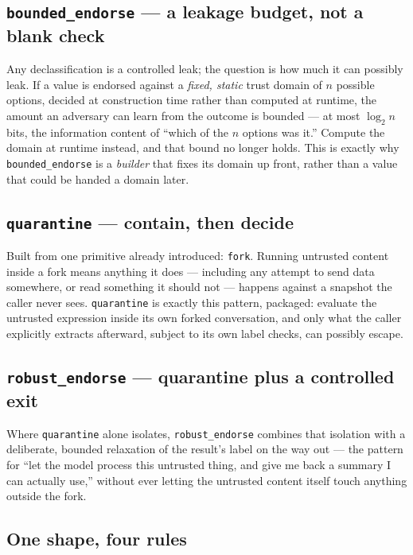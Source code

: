 \documentclass[11pt, a4paper]{article}
\begin{document}
\subsection{\texttt{bounded\_endorse} --- a leakage budget, not a blank check}

Any declassification is a controlled leak; the question is how much it
can possibly leak. If a value is endorsed against a \emph{fixed, static}
trust domain of $n$ possible options, decided at construction time rather
than computed at runtime, the amount an adversary can learn from the
outcome is bounded --- at most $\log_2 n$ bits, the information content of
``which of the $n$ options was it.'' Compute the domain at runtime
instead, and that bound no longer holds. This is exactly why
\lstinline{bounded_endorse} is a \emph{builder} that fixes its domain up
front, rather than a value that could be handed a domain later.

\subsection{\texttt{quarantine} --- contain, then decide}

Built from one primitive already introduced: \lstinline{fork}. Running
untrusted content inside a fork means anything it does --- including any
attempt to send data somewhere, or read something it should not ---
happens against a snapshot the caller never sees. \lstinline{quarantine}
is exactly this pattern, packaged: evaluate the untrusted expression
inside its own forked conversation, and only what the caller explicitly
extracts afterward, subject to its own label checks, can possibly escape.

\subsection{\texttt{robust\_endorse} --- quarantine plus a controlled exit}

Where \lstinline{quarantine} alone isolates, \lstinline{robust_endorse}
combines that isolation with a deliberate, bounded relaxation of the
result's label on the way out --- the pattern for ``let the model process
this untrusted thing, and give me back a summary I can actually use,''
without ever letting the untrusted content itself touch anything outside
the fork.

\subsection{One shape, four rules}
\end{document}
